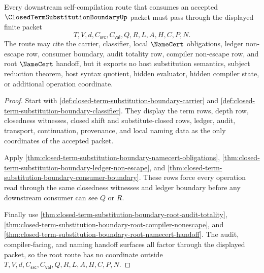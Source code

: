 \begin{theorem}
\label{thm:closed-term-substitution-boundary-root-route-lock}
Every downstream self-compilation route that consumes an accepted $\ClosedTermSubstitutionBoundaryUp$ packet must pass through the displayed finite packet
$$
T,V,d,C_{\mathsf{src}},C_{\mathsf{val}},Q,R,L,A,H,C,P,N.
$$
The route may cite the carrier, classifier, local $\NameCert$ obligations, ledger non-escape row, consumer boundary, audit totality row, compiler non-escape row, and root $\NameCert$ handoff, but it exports no host substitution semantics, subject reduction theorem, host syntax quotient, hidden evaluator, hidden compiler state, or additional operation coordinate.
\end{theorem}
\begin{proof}
Start with \autoref{def:closed-term-substitution-boundary-carrier} and \autoref{def:closed-term-substitution-boundary-classifier}. They display the term rows, depth row, closedness witnesses, closed shift and substitute-closed rows, ledger, audit, transport, continuation, provenance, and local naming data as the only coordinates of the accepted packet.

Apply \autoref{thm:closed-term-substitution-boundary-namecert-obligations}, \autoref{thm:closed-term-substitution-boundary-ledger-non-escape}, and \autoref{thm:closed-term-substitution-boundary-consumer-boundary}. These rows force every operation read through the same closedness witnesses and ledger boundary before any downstream consumer can see $Q$ or $R$.

Finally use \autoref{thm:closed-term-substitution-boundary-root-audit-totality}, \autoref{thm:closed-term-substitution-boundary-root-compiler-nonescape}, and \autoref{thm:closed-term-substitution-boundary-root-namecert-handoff}. The audit, compiler-facing, and naming handoff surfaces all factor through the displayed packet, so the root route has no coordinate outside $T,V,d,C_{\mathsf{src}},C_{\mathsf{val}},Q,R,L,A,H,C,P,N$.
\end{proof}

